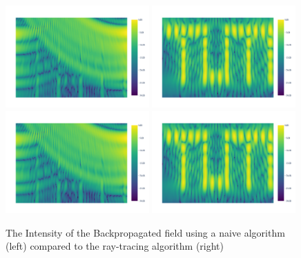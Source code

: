 \begin{figure}[p]
    \includegraphics[page=2, width=0.49\textwidth]{figures/pure_nlos_naive.pdf}
    \includegraphics[page=2, width=0.49\textwidth]{figures/pure_nlos.pdf}
    \includegraphics[page=1, width=0.49\textwidth]{figures/pure_nlos_naive.pdf}
    \includegraphics[page=1, width=0.49\textwidth]{figures/pure_nlos.pdf}
    \caption{The Intensity of the Backpropagated field using a naive algorithm (left) compared to the ray-tracing algorithm (right)}\label{fig:nlos_results}
\end{figure}

